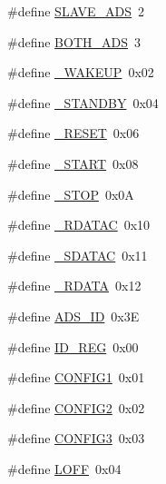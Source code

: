 \begin{DoxyCompactItemize}
\#define \hyperlink{group___definitions___a_d_s1299_ga9f6d4df6ea7c1bb44cd2800dec6a3d01}{S\+L\+A\+V\+E\+\_\+\+A\+D\+S}~2
\item 
\#define \hyperlink{group___definitions___a_d_s1299_gaadd2d23e89f5cb1196176cee428631a7}{B\+O\+T\+H\+\_\+\+A\+D\+S}~3
\item 
\#define \hyperlink{group___definitions___a_d_s1299_ga86c38abe57dc4854705d1ca395e65a54}{\+\_\+\+W\+A\+K\+E\+U\+P}~0x02
\item 
\#define \hyperlink{group___definitions___a_d_s1299_gae75728a5fdc9a5761a4e9cd52d5c45a0}{\+\_\+\+S\+T\+A\+N\+D\+B\+Y}~0x04
\item 
\#define \hyperlink{group___definitions___a_d_s1299_gae0b867da2bcc6a8910ba93baec7380ec}{\+\_\+\+R\+E\+S\+E\+T}~0x06
\item 
\#define \hyperlink{group___definitions___a_d_s1299_ga484ccc8af4c825fd4897a25683e63745}{\+\_\+\+S\+T\+A\+R\+T}~0x08
\item 
\#define \hyperlink{group___definitions___a_d_s1299_gabaa9184ccb1f6768e6f8b6b3e86e1b5e}{\+\_\+\+S\+T\+O\+P}~0x0\+A
\item 
\#define \hyperlink{group___definitions___a_d_s1299_gab1c685ad3f69a4c28f19b19a13c725d0}{\+\_\+\+R\+D\+A\+T\+A\+C}~0x10
\item 
\#define \hyperlink{group___definitions___a_d_s1299_ga4f962a0b8818881f4dd33aeb8dedd5b2}{\+\_\+\+S\+D\+A\+T\+A\+C}~0x11
\item 
\#define \hyperlink{group___definitions___a_d_s1299_ga0902995cb5c5c4c46e34653033f74e08}{\+\_\+\+R\+D\+A\+T\+A}~0x12
\item 
\#define \hyperlink{group___definitions___a_d_s1299_ga92b6f8d865f3531d98e011446da275a6}{A\+D\+S\+\_\+\+I\+D}~0x3\+E
\item 
\#define \hyperlink{group___definitions___a_d_s1299_ga95c754a9fe808331240df62b32f782d5}{I\+D\+\_\+\+R\+E\+G}~0x00
\item 
\#define \hyperlink{group___definitions___a_d_s1299_gae28dbf424985dc1c58ae7dbc5a0926b9}{C\+O\+N\+F\+I\+G1}~0x01
\item 
\#define \hyperlink{group___definitions___a_d_s1299_ga9989dac1034e36497f2f4f81613cab88}{C\+O\+N\+F\+I\+G2}~0x02
\item 
\#define \hyperlink{group___definitions___a_d_s1299_ga8d128687074c874210b0c9dada3d8ca7}{C\+O\+N\+F\+I\+G3}~0x03
\item 
\#define \hyperlink{group___definitions___a_d_s1299_gabb4faa9cfd0d710c0b6311baf45f506f}{L\+O\+F\+F}~0x04
\item 

\end{DoxyCompactItemize}
